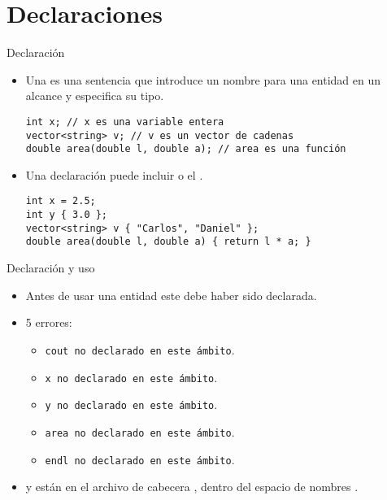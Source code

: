 \section{Declaraciones}

\begin{frame}[t,fragile]{Declaración}
\begin{itemize}
  \item Una  es una sentencia que introduce un nombre
        para una entidad en un alcance y especifica su tipo.
\begin{lstlisting}
int x; // x es una variable entera
vector<string> v; // v es un vector de cadenas
double area(double l, double a); // area es una función
\end{lstlisting}
  \item Una declaración puede incluir 
        o el .
\begin{lstlisting}
int x = 2.5;
int y { 3.0 };
vector<string> v { "Carlos", "Daniel" };
double area(double l, double a) { return l * a; }
\end{lstlisting}
\end{itemize}
\end{frame}

\begin{frame}[t,fragile]{Declaración y uso}
\begin{itemize}
  \item Antes de usar una entidad este debe haber sido declarada.


  \item 5 errores:
    \begin{itemize}
      \item \texttt{cout no declarado en este ámbito}.
      \item \texttt{x no declarado en este ámbito}.
      \item \texttt{y no declarado en este ámbito}.
      \item \texttt{area no declarado en este ámbito}.
      \item \texttt{endl no declarado en este ámbito}.
    \end{itemize}

  \item {} y  están  
        en el archivo de cabecera , 
        dentro del espacio de nombres .
\end{itemize}
\end{frame}

